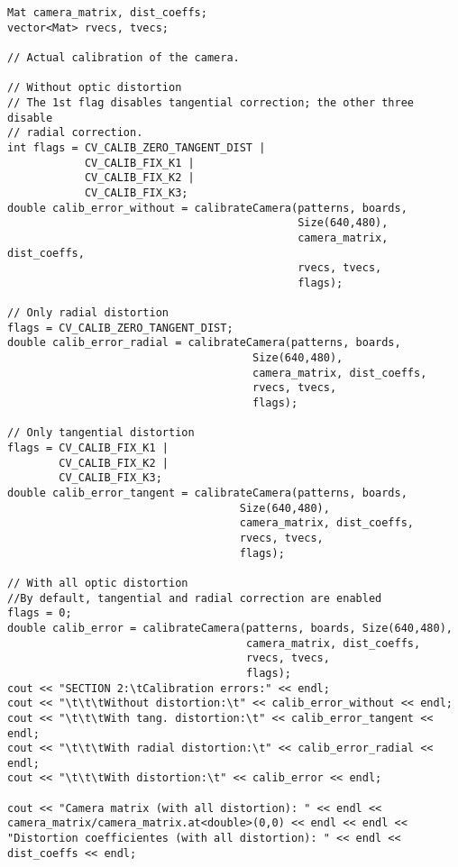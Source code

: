\documentclass[a4paper, 11pt]{article}
\theoremstyle{definition}
\theoremstyle{theorem}
\begin{document}
    \begin{lstlisting}
Mat camera_matrix, dist_coeffs;
vector<Mat> rvecs, tvecs;

// Actual calibration of the camera.

// Without optic distortion
// The 1st flag disables tangential correction; the other three disable
// radial correction.
int flags = CV_CALIB_ZERO_TANGENT_DIST |
            CV_CALIB_FIX_K1 |
            CV_CALIB_FIX_K2 |
            CV_CALIB_FIX_K3;
double calib_error_without = calibrateCamera(patterns, boards,
                                             Size(640,480),
                                             camera_matrix, dist_coeffs,
                                             rvecs, tvecs,
                                             flags);

// Only radial distortion
flags = CV_CALIB_ZERO_TANGENT_DIST;
double calib_error_radial = calibrateCamera(patterns, boards,
                                      Size(640,480),
                                      camera_matrix, dist_coeffs,
                                      rvecs, tvecs,
                                      flags);

// Only tangential distortion
flags = CV_CALIB_FIX_K1 |
        CV_CALIB_FIX_K2 |
        CV_CALIB_FIX_K3;
double calib_error_tangent = calibrateCamera(patterns, boards,
                                    Size(640,480),
                                    camera_matrix, dist_coeffs,
                                    rvecs, tvecs,
                                    flags);

// With all optic distortion
//By default, tangential and radial correction are enabled
flags = 0;
double calib_error = calibrateCamera(patterns, boards, Size(640,480),
                                     camera_matrix, dist_coeffs,
                                     rvecs, tvecs,
                                     flags);
cout << "SECTION 2:\tCalibration errors:" << endl;
cout << "\t\t\tWithout distortion:\t" << calib_error_without << endl;
cout << "\t\t\tWith tang. distortion:\t" << calib_error_tangent << endl;
cout << "\t\t\tWith radial distortion:\t" << calib_error_radial << endl;
cout << "\t\t\tWith distortion:\t" << calib_error << endl;

cout << "Camera matrix (with all distortion): " << endl << camera_matrix/camera_matrix.at<double>(0,0) << endl << endl << "Distortion coefficientes (with all distortion): " << endl << dist_coeffs << endl;
    \end{lstlisting}
\end{document}
